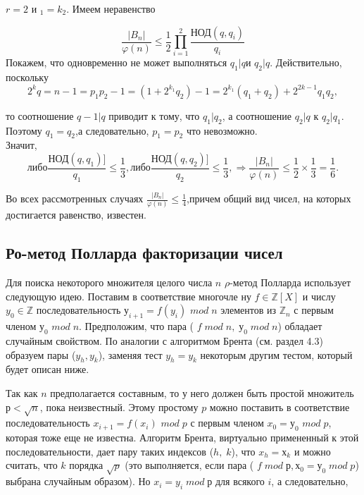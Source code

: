 \documentclass{mai_book}
\begin{document}
	\begin{beznomera}[Случай]
		$r=2$ и $_1 = k_2$. Имеем неравенство 
		
		\begin{equation}
		\frac{|B_n|}{\varphi(n)} \leqslant \frac{1}{2}\prod^{2}_{i=1} \frac{\text{НОД}(q,q_i)}{q_i}
		\end{equation}
		Покажем, что одновременно не может выполняться $q_1 | q$и $q_2|q$. Действительно, поскольку 
		\begin{equation}
		2^kq=n-1=p_1p_2-1=(1+2^{k_{1}}q_2)-1=2^{k_1}(q_1+q_2)+2^{2k-1}q_1q_2,
		\end{equation}
	
		то соотношение $q-1|q$ приводит к тому, что  $q_1|q_2$, а соотношение $q_2|q$ к $q_2|q_1$. Поэтому $q_1=q_2$,а следовательно, $p_1=p_2$ что невозможно. \\	Значит,
		\begin{equation}
		\text{либо} \frac{\text{НОД}(q,q_1)]}{q_1} \leqslant \frac{1}{3}, \text{либо} \frac{\text{НОД}(q,q_2)]}{q_2} \leqslant \frac{1}{3}, \Rightarrow \frac{|B_n|}{\varphi(n)} \leqslant \frac{1}{2} \times \frac{1}{3} = \frac{1}{6}.
		\end{equation}
		
	\end{beznomera}	

	Во всех рассмотренных случаях $\frac{|B_n|}{\varphi(n)} \leqslant \frac{1}{4}$,причем общий вид чисел, на	которых достигается равенство, известен.
	
	\pagebreak
	
	\subsection{Ро-метод Полларда факторизации чисел}
	\noindent
	Для поиска некоторого множителя целого числа $n$ $\rho$-метод Поллар­да использует следующую идею. Поставим в соответствие многочле ну $f \in \mathbb Z[X]$ и числу $y_0 \in \mathbb Z$ последовательность $у_{i+1} = f(y_i)$ $mod\;n$
	элементов из $\mathbb Z_n$ с первым членом $у_0$ $mod\;n$. Предположим, что пара ( $f\;mod \;n,\;у_0\;mod\;n$) обладает случайным свойством. По аналогии с алгоритмом Брента (см. раздел 4.3) образуем пары ($y_h,y_k$), заменяя тест	$y_h=y_k$
	некоторым другим тестом, который будет описан ниже.
	
	Так как $n$ предполагается составным, то у него должен быть про­стой множитель $р < \sqrt{n}$, пока неизвестный. Этому простому $p$ можно	поставить в соответствие последовательность $x_{i+1} = f(x_i)$ $mod\;p$ с первым членом $x_0 = у_0$ $mod\;p$, которая тоже еще не известна. Алгоритм	Брента, виртуально примененный к этой последовательности, дает пару таких индексов ($h,\;k$), что $x_h= х_k$
	и можно считать, что $k$ порядка	$\sqrt{p}$ (это выполняется, если пара ( $f\;mod\;р, х_0 = у_0\;mod\;p$) выбрана случайным образом). Но $x_i = y_i\;mod\;р$ для всякого $i$, а следовательно,
	
\end{document}
